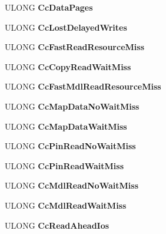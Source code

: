 \begin{DoxyCompactItemize}
U\+L\+O\+NG {\bfseries Cc\+Data\+Pages}
\item 
\mbox{\label{struct___k_p_r_c_b_a0b4975c94119be08b661d550493a2dbb}} 
U\+L\+O\+NG {\bfseries Cc\+Lost\+Delayed\+Writes}
\item 
\mbox{\label{struct___k_p_r_c_b_aa99eeb07b10172d84cff56af5d6059bb}} 
U\+L\+O\+NG {\bfseries Cc\+Fast\+Read\+Resource\+Miss}
\item 
\mbox{\label{struct___k_p_r_c_b_acc2f21de151db4cad5ce74dbc895c984}} 
U\+L\+O\+NG {\bfseries Cc\+Copy\+Read\+Wait\+Miss}
\item 
\mbox{\label{struct___k_p_r_c_b_afa60de14d941b8f4b75bab7a7998b35b}} 
U\+L\+O\+NG {\bfseries Cc\+Fast\+Mdl\+Read\+Resource\+Miss}
\item 
\mbox{\label{struct___k_p_r_c_b_a80e744722b967f7b91b893300b55b567}} 
U\+L\+O\+NG {\bfseries Cc\+Map\+Data\+No\+Wait\+Miss}
\item 
\mbox{\label{struct___k_p_r_c_b_a1e6ec1e80ca85b30a7f80ac8b99d50a9}} 
U\+L\+O\+NG {\bfseries Cc\+Map\+Data\+Wait\+Miss}
\item 
\mbox{\label{struct___k_p_r_c_b_a4228b35ee45e02803daf664d2c094a0c}} 
U\+L\+O\+NG {\bfseries Cc\+Pin\+Read\+No\+Wait\+Miss}
\item 
\mbox{\label{struct___k_p_r_c_b_a8d9982eaed47f783c61e3bef8208428c}} 
U\+L\+O\+NG {\bfseries Cc\+Pin\+Read\+Wait\+Miss}
\item 
\mbox{\label{struct___k_p_r_c_b_a6743a3e8e54c638b3f9b9584cf4ba3fb}} 
U\+L\+O\+NG {\bfseries Cc\+Mdl\+Read\+No\+Wait\+Miss}
\item 
\mbox{\label{struct___k_p_r_c_b_a555da2abb0806994b9e8819a1d0392f0}} 
U\+L\+O\+NG {\bfseries Cc\+Mdl\+Read\+Wait\+Miss}
\item 
\mbox{\label{struct___k_p_r_c_b_a1c783362cd6e660fa7b72f9aa8cbe376}} 
U\+L\+O\+NG {\bfseries Cc\+Read\+Ahead\+Ios}

\end{DoxyCompactItemize}
